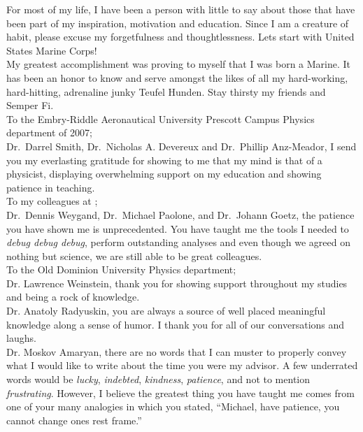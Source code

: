 %
For most of my life, I have been a person with little to say about those that have been part of my inspiration, motivation and education. Since I am a creature of habit, please excuse my forgetfulness and thoughtlessness.\newline  \newline 
Lets start with United States Marine Corps!\\
\indent My greatest accomplishment was proving to myself that I was born a Marine. It has been an honor to know and serve amongst the likes of all my hard-working, hard-hitting, adrenaline junky Teufel Hunden. Stay thirsty my friends and Semper Fi.\\
To the Embry-Riddle Aeronautical University Prescott Campus Physics department of 2007;\\
\indent Dr.~Darrel Smith, Dr.~Nicholas A. Devereux and Dr.~Phillip Anz-Meador, I send you my everlasting gratitude for showing to me that my mind is that of a physicist, displaying overwhelming support on my education and showing patience in teaching. \\
To my colleagues at  ;\\
\indent Dr.~Dennis Weygand, Dr.~Michael Paolone, and Dr.~Johann Goetz, the patience you have shown me is unprecedented. You have taught me the tools I needed to \emph{debug debug debug}, perform outstanding analyses and even though we agreed on nothing but science, we are still able to be great colleagues.\\
To the Old Dominion University Physics department;\\
\indent Dr. Lawrence Weinstein, thank you for showing support throughout my studies and being a rock of knowledge. \\
\indent Dr. Anatoly Radyuskin, you are always a source of well placed meaningful knowledge along a sense of humor. I thank you for all of our conversations and laughs. \\
\indent Dr. Moskov Amaryan, there are no words that I can muster to properly convey what I would like to write about the time you were my advisor. A few underrated words would be \emph{lucky}, \emph{indebted}, \emph{kindness}, \emph{patience}, and not to mention \emph{frustrating}. However, I believe the greatest thing you have taught me comes from one of your many analogies in which you stated, ``Michael, have patience, you cannot change ones rest frame.''\\
